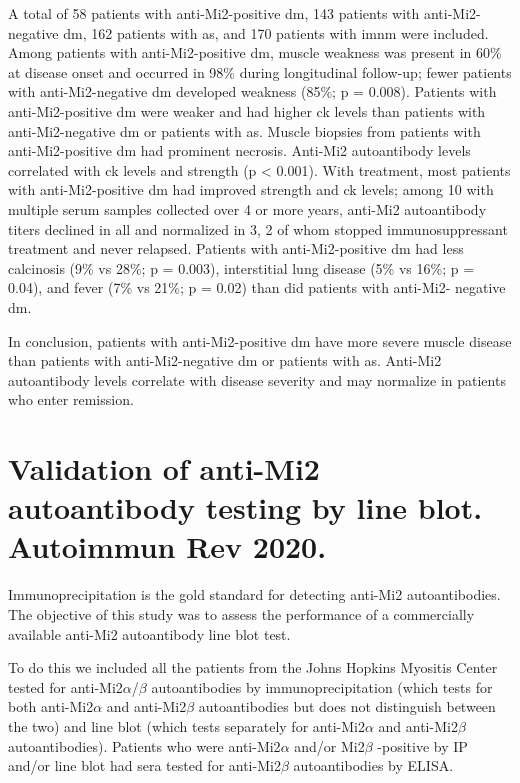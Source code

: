 A total of 58 patients with anti-Mi2-positive \gls{dm}, 143 patients with anti-Mi2-negative \gls{dm}, 162 patients with \gls{as}, and 170 patients with \gls{imnm} were included. Among patients with anti-Mi2-positive \gls{dm}, muscle weakness was present in 60\% at disease onset and occurred in 98\% during longitudinal follow-up; fewer patients with anti-Mi2-negative \gls{dm} developed weakness (85\%; p = 0.008). Patients with anti-Mi2-positive \gls{dm} were weaker and had higher \gls{ck} levels than patients with anti-Mi2-negative \gls{dm} or patients with \gls{as}. Muscle biopsies from patients with anti-Mi2-positive \gls{dm} had prominent necrosis. Anti-Mi2 autoantibody levels correlated with \gls{ck} levels and strength (p < 0.001). With treatment, most patients with anti-Mi2-positive \gls{dm} had improved strength and \gls{ck} levels; among 10 with multiple serum samples collected over 4 or more years, anti-Mi2 autoantibody titers declined in all and normalized in 3, 2 of whom stopped immunosuppressant treatment and never relapsed. Patients with anti-Mi2-positive \gls{dm} had less calcinosis (9\% vs 28\%; p = 0.003), interstitial lung disease (5\% vs 16\%; p = 0.04), and fever (7\% vs 21\%; p = 0.02) than did patients with anti-Mi2- negative \gls{dm}.

In conclusion, patients with anti-Mi2-positive \gls{dm} have more severe muscle disease than patients with anti-Mi2-negative \gls{dm} or patients with \gls{as}. Anti-Mi2 autoantibody levels correlate with disease severity and may normalize in patients who enter remission.


{\cleardoublepage}

\section{Validation of anti-Mi2 autoantibody testing by line blot. Autoimmun Rev 2020.}
\label{sec:mi2_serologic}

Immunoprecipitation is the gold standard for detecting anti-Mi2 autoantibodies. The objective of this study was to assess the performance of a commercially available anti-Mi2 autoantibody line blot test.

To do this we included all the patients from the Johns Hopkins Myositis Center tested for anti-Mi2$\alpha$/$\beta$ autoantibodies by immunoprecipitation (which tests for both anti-Mi2$\alpha$ and anti-Mi2$\beta$ autoantibodies but does not distinguish between the two) and line blot (which tests separately for anti-Mi2$\alpha$ and anti-Mi2$\beta$ autoantibodies).  Patients who were anti-Mi2$\alpha$ and/or Mi2$\beta$ -positive by IP and/or line blot had sera tested for anti-Mi2$\beta$  autoantibodies by ELISA.     


